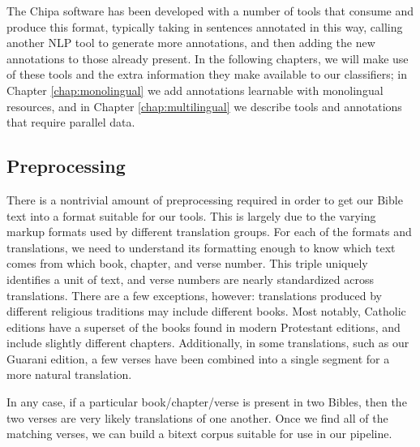 
The Chipa software has been developed with a number of tools that consume and
produce this format, typically taking in sentences annotated in this way,
calling another NLP tool to generate more annotations, and then adding the new
annotations to those already present. In the following chapters, we will make
use of these tools and the extra information they make available to our
classifiers; in Chapter \ref{chap:monolingual} we add annotations learnable
with monolingual resources, and in Chapter \ref{chap:multilingual} we describe
tools and annotations that require parallel data.

\subsection{Preprocessing}

There is a nontrivial amount of preprocessing required in order to get our
Bible text into a format suitable for our tools.  This is largely due to the
varying markup formats used by different translation groups.
For each of the formats and translations, we need to understand its formatting
enough to know which text comes from which book, chapter, and verse number.
This triple uniquely identifies a unit of text, and verse numbers are nearly
standardized across translations.  There are a few exceptions, however:
translations produced by different religious traditions may include different
books. Most notably, Catholic editions have a superset of the books found in
modern Protestant editions, and include slightly different chapters.
Additionally, in some translations, such as our Guarani edition, a few verses
have been combined into a single segment for a more natural translation.


In any case, if a particular book/chapter/verse is present in two Bibles, then
the two verses are very likely translations of one another. Once we find all of
the matching verses, we can build a bitext corpus suitable for use in our
pipeline.


